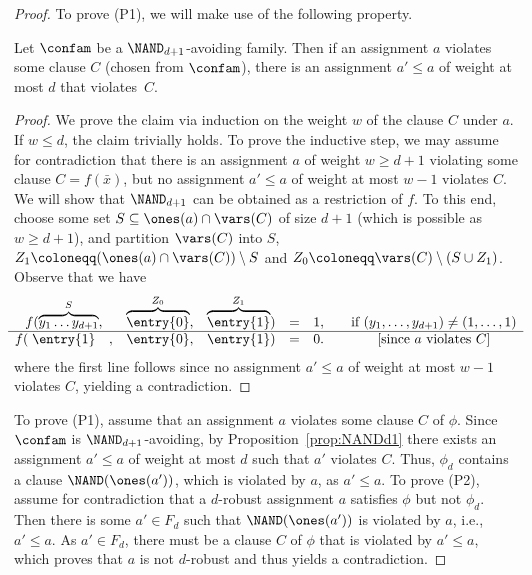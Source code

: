   \begin{proof}
  To prove (P1), we will make use of the following property.
  \begin{prop}\label{prop:NANDd1}
  Let $\confam$ be a $\NAND_{d+1}$-avoiding family. Then if an assignment $a$ violates some clause $C$ (chosen from $\confam$), there is an assignment $a' \le a$ of weight at most $d$ that violates~$C$.
  \end{prop}
  \begin{proof}
  We prove the claim via induction on the weight $w$ of the clause $C$ under $a$. If $w \le d$, the claim trivially holds. To prove the inductive step, we may assume for contradiction that there is an assignment $a$ of weight $w\ge d+1$ violating some clause $C=f(\bar{x})$, but no assignment $a' \le a$ of weight at most $w-1$ violates $C$. We will show that $\NAND_{d+1}$ can be obtained as a restriction of $f$. 
  To this end, choose some set $S \subseteq \ones(a) \cap \vars(C)$ of size $d+1$ (which is possible as $w\ge d+1$), and partition $\vars(C)$ into $S$, $Z_1 \coloneqq (\ones(a) \cap \vars(C)) \setminus S$ and $Z_0 \coloneqq \vars(C) \setminus (S\cup Z_1)$. Observe that we have   
  \begin{align*}
  \begin{matrix}
f( \overbrace{y_1\dots y_{d+1}}^{S},& \overbrace{\entry{0}}^{Z_0}, & \overbrace{\entry{1}}^{Z_1}) & = & 1, & \quad \text{if $(y_1,\dots,y_{d+1})\ne (1,\dots, 1)$}\\
  \hline
f( \; \entry{1}\quad,& \entry{0}, & \entry{1}) & = & 0. & \quad\text{[since $a$ violates $C$]}
    \end{matrix}
    \end{align*}
    where the first line follows since no assignment $a' \le a$ of weight at most $w-1$ violates $C$, yielding a contradiction.
  
  \cqed \end{proof}
  To prove (P1), assume that an assignment $a$ violates some clause $C$ of $\phi$. Since $\confam$ is $\NAND_{d+1}$-avoiding, by Proposition~\ref{prop:NANDd1} there exists an assignment $a'\le a$ of weight at most $d$ such that $a'$ violates $C$. Thus, $\phi_d$ contains a clause $\NAND(\ones(a'))$, which is violated by $a$, as $a' \le a$.
%
  To prove (P2), assume for contradiction that a $d$-robust assignment $a$ satisfies $\phi$ but not $\phi_d$. Then there is some $a' \in F_d$ such that $\NAND(\ones(a'))$ is violated by $a$, i.e., $a' \le a$. As $a' \in F_d$, there must be a clause $C$ of $\phi$ that is violated by $a'\le a$, which proves that $a$ is not $d$-robust and thus yields a contradiction.
  \end{proof}
